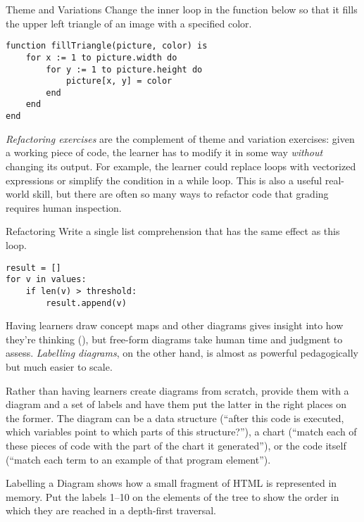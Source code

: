\begin{aside}{Theme and Variations}
  Change the inner loop in the function below
  so that it fills the upper left triangle of an image with a specified color.

\begin{verbatim}
function fillTriangle(picture, color) is
    for x := 1 to picture.width do
        for y := 1 to picture.height do
            picture[x, y] = color
        end
    end
end
\end{verbatim}
\end{aside}

\emph{Refactoring exercises} are the complement of theme and variation exercises:
given a working piece of code,
the learner has to modify it in some way \emph{without} changing its output.
For example,
the learner could replace loops with vectorized expressions
or simplify the condition in a while loop.
This is also a useful real-world skill,
but there are often so many ways to refactor code
that grading requires human inspection.

\begin{aside}{Refactoring}
  Write a single list comprehension
  that has the same effect as this loop.

\begin{verbatim}
result = []
for v in values:
    if len(v) > threshold:
        result.append(v)
\end{verbatim}
\end{aside}


Having learners draw concept maps and other diagrams
gives insight into how they're thinking (),
but free-form diagrams take human time and judgment to assess.
\emph{Labelling diagrams},
on the other hand,
is almost as powerful pedagogically
but much easier to scale.

Rather than having learners create diagrams from scratch,
provide them with a diagram and a set of labels
and have them put the latter in the right places on the former.
The diagram can be a data structure
(``after this code is executed, which variables point to which parts of this structure?''),
a chart (``match each of these pieces of code with the part of the chart it generated''),
or the code itself (``match each term to an example of that program element'').

\begin{aside}{Labelling a Diagram}
   shows
  how a small fragment of HTML is represented in memory.
  Put the labels 1--10 on the elements of the tree
  to show the order in which they are reached in a depth-first traversal.
\end{aside}


